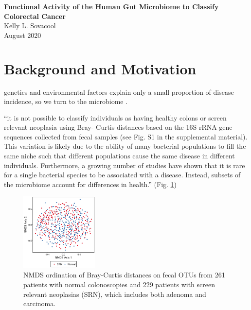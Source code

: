 \documentclass[11pt]{article}
\begin{document}
\sloppy
\begin{center}
\large{\textbf{
    Functional Activity of the Human Gut Microbiome to Classify Colorectal Cancer
}} \\
\vspace{11pt}
\small{
    Kelly L. Sovacool \\
    August 2020
}
\end{center}



\section*{Background and Motivation} %

genetics and environmental factors explain only a small proportion of disease incidence, so we turn to the microbiome \cite{thomas_metagenomic_2019}.

``it is not possible to classify individuals as having healthy colons or screen relevant neoplasia using Bray- Curtis distances based on the 16S rRNA gene sequences collected from fecal samples (see Fig. S1 in the supplemental material). This variation is likely due to the ability of many bacterial populations to fill the same niche such that different populations cause the same disease in different individuals. Furthermore, a growing number of studies have shown that it is rare for a single bacterial species to be associated with a disease. Instead, subsets of the microbiome account for differences in health.'' \cite{topcuoglu_framework_2020} (Fig. \ref{fig:nmds_otu})

\begin{figure}
    \vspace{-20pt}
    \begin{center}
        \includegraphics[width=0.35\textwidth]{figures/topcuoglu_s1.png}
        \caption{NMDS ordination of Bray-Curtis distances on fecal OTUs from 261 patients with normal colonoscopies and 229 patients with screen relevant neoplasias (SRN), which includes both adenoma and carcinoma. \cite{topcuoglu_framework_2020}}
        \label{fig:nmds_otu}
    \end{center}
    \vspace{-20pt}
\end{figure}
\end{document}
